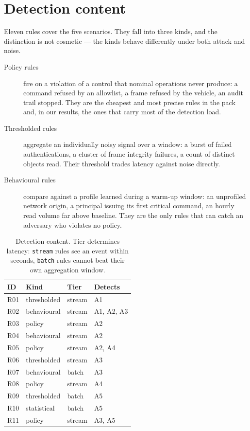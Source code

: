 \section{Detection content}
\label{sec:detection}

Eleven rules cover the five scenarios. They fall into three kinds, and the
distinction is not cosmetic --- the kinds behave differently under both attack and
noise.

\begin{description}
\item[Policy rules] fire on a violation of a control that nominal operations
never produce: a command refused by an allowlist, a frame refused by the
vehicle, an audit trail stopped. They are the cheapest and most precise rules in
the pack and, in our results, the ones that carry most of the detection load.
\item[Thresholded rules] aggregate an individually noisy signal over a window: a
burst of failed authentications, a cluster of frame integrity failures, a count
of distinct objects read. Their threshold trades latency against noise directly.
\item[Behavioural rules] compare against a profile learned during a warm-up
window: an unprofiled network origin, a principal issuing its first critical
command, an hourly read volume far above baseline. They are the only rules that
can catch an adversary who violates no policy.
\end{description}

\begin{table}[t]
\centering
\small
\caption{Detection content. Tier determines latency: \texttt{stream} rules see an
event within seconds, \texttt{batch} rules cannot beat their own aggregation
window.}
\label{tab:rules-catalogue}
\begin{tabular}{@{}llll@{}}
\toprule
ID & Kind & Tier & Detects \\
\midrule
R01 & thresholded  & stream & A1 \\
R02 & behavioural  & stream & A1, A2, A3 \\
R03 & policy       & stream & A2 \\
R04 & behavioural  & stream & A2 \\
R05 & policy       & stream & A2, A4 \\
R06 & thresholded  & stream & A3 \\
R07 & behavioural  & batch  & A3 \\
R08 & policy       & stream & A4 \\
R09 & thresholded  & batch  & A5 \\
R10 & statistical  & batch  & A5 \\
R11 & policy       & stream & A3, A5 \\
\bottomrule
\end{tabular}
\end{table}

